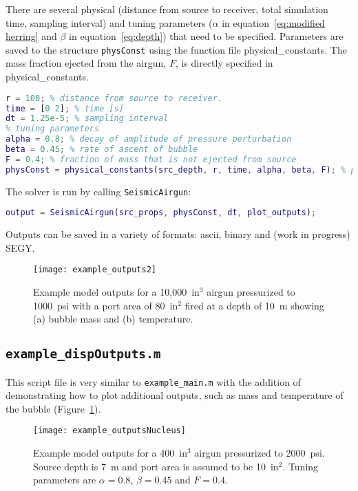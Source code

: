 \documentclass[10pt]{article}
\begin{document}
There are several physical (distance from source to receiver, total simulation time, sampling interval) and tuning parameters ($\alpha$ in equation~\ref{eq:modified herring} and $\beta$ in equation~\ref{eq:depth}) that need to be specified. Parameters are saved to the structure \texttt{physConst} using the function file {physical\_constants}. The mass fraction ejected from the airgun, $F$, is directly specified in {physical\_constants}.
\begin{lstlisting}[language=Matlab]
% Physical and Tuning Parameters
r = 100; % distance from source to receiver. 
time = [0 2]; % time [s]
dt = 1.25e-5; % sampling interval
% tuning parameters
alpha = 0.8; % decay of amplitude of pressure perturbation
beta = 0.45; % rate of ascent of bubble
F = 0.4; % fraction of mass that is not ejected from source
physConst = physical_constants(src_depth, r, time, alpha, beta, F); % physical constant

\end{lstlisting}

The solver is run by calling \texttt{SeismicAirgun}:
\begin{lstlisting}[language=Matlab]
output = SeismicAirgun(src_props, physConst, dt, plot_outputs); 
\end{lstlisting}
Outputs can be saved in a variety of formats: ascii, binary and (work in progress) SEGY.

\begin{figure}[t!]
\centering
\texttt{[image: example\_outputs2]}
\caption{Example model outputs for a 10,000~in$^3$ airgun pressurized to 1000~psi with a port area of 80~in$^2$ fired at a depth of 10~m showing (a) bubble mass and (b) temperature.}
\label{fig:example outputs2}
\end{figure}

\subsection{\texttt{example\_dispOutputs.m}}
This script file is very similar to \texttt{example\_main.m} with the addition of demonstrating how to plot additional outputs, such as mass and temperature of the bubble (Figure~\ref{fig:example outputs2}).

\begin{figure}[b!]
\centering
\texttt{[image: example\_outputsNucleus]}
\caption{Example model outputs for a 400~in$^3$ airgun pressurized to 2000~psi. Source depth is 7~m and port area is assumed to be 10~in$^2$. Tuning parameters are $\alpha=0.8$, $\beta=0.45$ and $F=0.4$.}
\label{fig:example outputsNucleus}
\end{figure}
\end{document}
